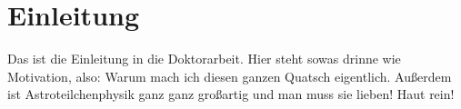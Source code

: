 \chapter{Einleitung}
Das ist die Einleitung in die Doktorarbeit. 
Hier steht sowas drinne wie Motivation, also: Warum mach ich diesen ganzen Quatsch eigentlich.
Außerdem ist Astroteilchenphysik ganz ganz großartig und man muss sie lieben!
Haut rein!
